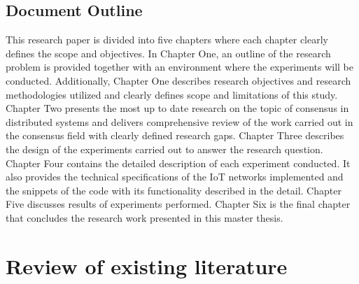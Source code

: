 \documentclass[oneside,12pt]{book}
\begin{document}
\section{Document Outline}
This research paper is divided into five chapters where each chapter clearly defines the scope and objectives.\smallskip \newline 
In Chapter One, an outline of the research problem is provided together with an environment where the experiments will be conducted. Additionally, Chapter One describes research objectives and research methodologies utilized and clearly defines scope and limitations of this study.\smallskip \newline  
Chapter Two presents the most up to date research on the topic of consensus in distributed systems and delivers comprehensive review of the work carried out in the consensus field with clearly defined research gaps.\smallskip \newline
Chapter Three describes the design of the experiments carried out to answer the research question.\smallskip \newline
Chapter Four contains the detailed description of each experiment conducted. It also provides the technical specifications of the IoT networks implemented and the snippets of the code with its functionality described in the detail.\smallskip \newline   
Chapter Five discusses results of experiments performed.\smallskip \newline
Chapter Six is the final chapter that concludes the research work presented in this master thesis.\smallskip \newline

\chapter{Review of existing literature}
\end{document}
